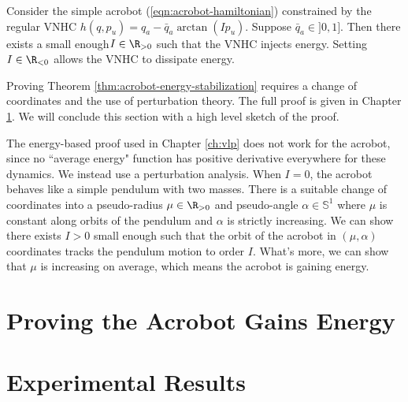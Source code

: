 \begin{thm}\label{thm:acrobot-energy-stabilization}
    Consider the simple acrobot (\ref{eqn:acrobot-hamiltonian}) constrained by
    the regular VNHC \(h(q,p_u) = q_a - \bar{q}_a \arctan(I p_u)\).
    Suppose \(\bar{q}_a \in ]0,1]\).
    Then there exists a small enough\footnotemark \(I \in \R_{>0}\)
    such that the VNHC injects energy. 
    Setting \(I \in \R_{<0}\) allows the VNHC to dissipate energy.
\end{thm}

Proving Theorem \ref{thm:acrobot-energy-stabilization} requires a change of
coordinates and the use of perturbation theory.
The full proof is given in Chapter \ref{sec:acrobot-proof}. 
We will conclude this section with a high level sketch of the proof.

The energy-based proof used in Chapter \ref{ch:vlp} does not work for the
acrobot, since no ``average energy" function has positive derivative everywhere
for these dynamics.
We instead use a perturbation analysis. 
When \(I = 0\), the acrobot behaves like a simple pendulum with two masses. 
There is a suitable change of coordinates into a pseudo-radius 
\(\mu \in \R_{>0}\) and pseudo-angle \(\alpha \in \mathbb{S}^1\) where \(\mu\)
is constant along orbits of the pendulum and \(\alpha\) is strictly increasing.
We can show there exists \(I > 0\) small enough such that
the orbit of the acrobot in \((\mu,\alpha)\) coordinates
tracks the pendulum motion to order \(I\).
What's more, we can show that \(\mu\) is increasing on average, which means the
acrobot is gaining energy.
 
\section{Proving the Acrobot Gains Energy}\label{sec:acrobot-proof}

\section{Experimental Results}

